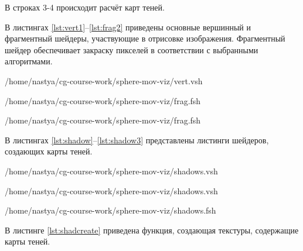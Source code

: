 В строках 3-4 происходит расчёт карт теней.

В листингах \ref{lst:vert1}--\ref{lst:frag2} приведены основные вершинный и фрагментный шейдеры, участвующие в отрисовке изображения. Фрагментный шейдер обеспечивает закраску пикселей в соответствии с выбранными алгоритмами.

\begin{lstinputlisting}[
	caption={Вершинный шейдер},
	label={lst:vert1},
	style={cpp},
	linerange={1-30},
	]{/home/nastya/cg-course-work/sphere-mov-viz/vert.vsh}
\end{lstinputlisting}

\pagebreak

\begin{lstinputlisting}[
	caption={Фрагментный шейдер},
	label={lst:frag1},
	style={cpp},
	linerange={1-47},
	]{/home/nastya/cg-course-work/sphere-mov-viz/frag.fsh}
\end{lstinputlisting}

\begin{lstinputlisting}[
	caption={Продолжение листинга \ref{lst:frag2}},
	label={lst:frag2},
	style={cpp},
	linerange={48-78},
	]{/home/nastya/cg-course-work/sphere-mov-viz/frag.fsh}
\end{lstinputlisting}

В листингах \ref{lst:shadow}--\ref{lst:shadow3} представлены листинги шейдеров, создающих карты теней.

\begin{lstinputlisting}[
	caption={Вершинный шейдер для создания карты теней},
	label={lst:shadow},
	style={cpp},
	linerange={1-7},
	]{/home/nastya/cg-course-work/sphere-mov-viz/shadows.vsh}
\end{lstinputlisting}

\begin{lstinputlisting}[
	caption={Продолжение листинга \ref{lst:shadow}},
	label={lst:shadow2},
	style={cpp},
	linerange={8-11},
	]{/home/nastya/cg-course-work/sphere-mov-viz/shadows.vsh}
\end{lstinputlisting}

\begin{lstinputlisting}[
	caption={Фрагментный шейдер для создания карты теней},
	label={lst:shadow3},
	style={cpp},
	]{/home/nastya/cg-course-work/sphere-mov-viz/shadows.fsh}
\end{lstinputlisting}

В листинге \ref{lst:shadcreate} приведена функция, создающая текстуры, содержащие карты теней.

